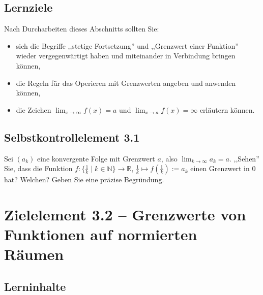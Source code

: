 \documentclass[a4paper,12pt]{article}
\begin{document}
\subsection*{Lernziele}

Nach Durcharbeiten dieses Abschnitts sollten Sie:
\begin{itemize}
  \item sich die Begriffe ,,stetige Fortsetzung'' und ,,Grenzwert einer Funktion''
        wieder vergegenw\"artigt haben und miteinander in Verbindung bringen
        k\"onnen,
  \item die Regeln f\"ur das Operieren mit Grenzwerten angeben und anwenden
        k\"onnen,
  \item die Zeichen $\lim_{x \to \infty} f(x) = a$ und $\lim_{x \to a} f(x) = \infty$
        erl\"autern k\"onnen.
\end{itemize}

\subsection*{Selbstkontrollelement 3.1}

Sei $(a_k)$ eine konvergente Folge mit Grenzwert $a$, also
$\lim_{k\to\infty} a_k = a$. ,,Sehen'' Sie, dass die Funktion
$f : \bigl\{\tfrac{1}{k} \mid k \in \mathbb{N}\bigr\} \to \mathbb{R}$,
$\tfrac{1}{k} \mapsto f(\tfrac{1}{k}) := a_k$ einen Grenzwert in $0$ hat?
Welchen? Geben Sie eine pr\"azise Begr\"undung.

\newpage

\section*{Zielelement 3.2 -- Grenzwerte von Funktionen auf normierten R\"aumen}

\subsection*{Lerninhalte}

\begin{center}
\end{center}
\end{document}
